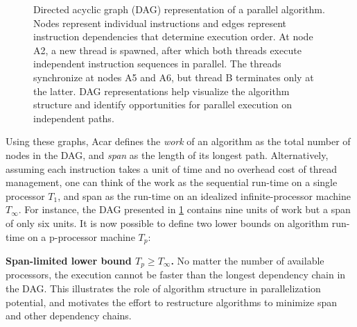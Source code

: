 \documentclass[english,12pt,a4paper,pdftex,sci,utf8]{aaltothesis}
\begin{document}
\begin{figure}[tbp]
\centering
{}
\caption{Directed acyclic graph (DAG) representation of a parallel algorithm. Nodes represent individual instructions and edges represent instruction dependencies that determine execution order. At node A2, a new thread is spawned, after which both threads execute independent instruction sequences in parallel. The threads synchronize at nodes A5 and A6, but thread B terminates only at the latter. DAG representations help visualize the algorithm structure and identify opportunities for parallel execution on independent paths.}
\label{fig:DAG-algo}
\end{figure}

Using these graphs, Acar \cite{acar2016parallel} defines the \emph{work} of an algorithm as the total number of nodes in the DAG, and \emph{span} as the length of its longest path. Alternatively, assuming each instruction takes a unit of time and no overhead cost of thread management, one can think of the work as the sequential run-time on a single processor $T_1$, and span as the run-time on an idealized infinite-processor machine $T_{\infty}$. For instance, the DAG presented in \cref{fig:DAG-algo} contains nine units of work but a span of only six units. It is now possible to define two lower bounds on algorithm run-time on a p-processor machine $T_p$:

\vspace{0.5\baselineskip}
\noindent\textbf{Span-limited lower bound $T_p \geq T_\infty$.} No matter the number of available processors, the execution cannot be faster than the longest dependency chain in the DAG. This illustrates the role of algorithm structure in parallelization potential, and motivates the effort to restructure algorithms to minimize span and other dependency chains.
\end{document}
